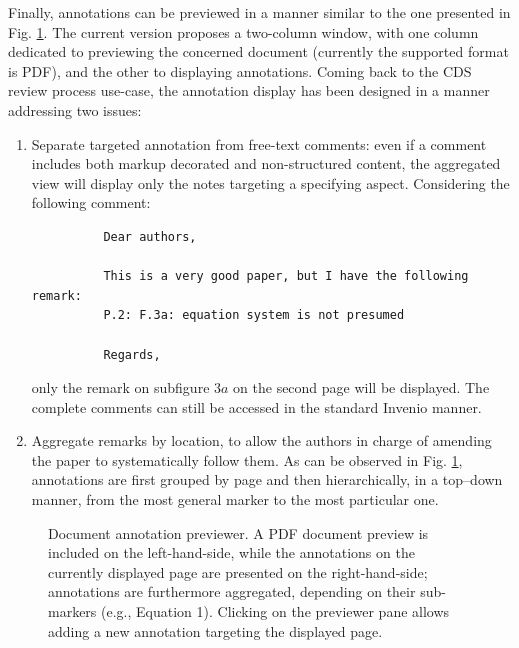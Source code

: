 Finally, annotations can be previewed in a manner similar to the one presented
in Fig. \ref{fig:noteview}. The current version proposes a two-column window,
with one column dedicated to previewing the concerned document (currently the
supported format is PDF), and the other to displaying annotations. Coming
back to the CDS review process use-case, the annotation display has been
designed in a manner addressing two issues:
\begin{enumerate}
  \item Separate targeted annotation from free-text comments: even if a comment
        includes both markup decorated and non-structured content, the
        aggregated view will display only the notes targeting a specifying
        aspect. Considering the following comment:
        \begin{verbatim}
          Dear authors,

          This is a very good paper, but I have the following remark:
          P.2: F.3a: equation system is not presumed 

          Regards,
        \end{verbatim}
        only the remark on subfigure $3a$ on the second page will be displayed.
        The complete comments can still be accessed in the standard Invenio
        manner.
  \item Aggregate remarks by location, to allow the authors in charge of
        amending the paper to systematically follow them. As can be observed in
        Fig. \ref{fig:noteview}, annotations are first grouped by page and then
        hierarchically, in a top--down manner, from the most general marker to
        the most particular one.
\end{enumerate}

\begin{figure}[!h]
  \centering
  \caption[Document annotation previewer]
          {Document annotation previewer. A PDF document preview is included on
           the left-hand-side, while the annotations on the currently displayed
           page are presented on the right-hand-side; annotations are
           furthermore aggregated, depending on their sub-markers (e.g.,
           Equation 1). Clicking on the previewer pane allows adding a new
           annotation targeting the displayed page.}
  \label{fig:noteview}
\end{figure}
